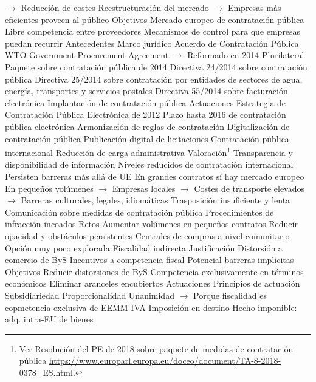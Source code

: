 \documentclass{nuevotema}
\begin{document}
\begin{esquemal}
				\4[] $\to$ Reducción de costes
				\4[] Reestructuración del mercado
				\4[] $\to$ Empresas más eficientes proveen al público
			\3 Objetivos
				\4 Mercado europeo de contratación pública
				\4 Libre competencia entre proveedores
				\4 Mecanismos de control para que empresas puedan recurrir
			\3 Antecedentes
			\3 Marco jurídico
				\4 Acuerdo de Contratación Pública WTO
				\4[] Government Procurement Agreement
				\4[] $\to$ Reformado en 2014
				\4[] Plurilateral
				\4 Paquete sobre contratación pública de 2014
				\4[] Directiva 24/2014 sobre contratación pública
				\4[] Directiva 25/2014 sobre contratación por entidades de sectores de agua, energía, transportes y servicios postales
				\4 Directiva 55/2014 sobre facturación electrónica
				\4[] Implantación de contratación pública
			\3 Actuaciones
				\4 Estrategia de Contratación Pública Electrónica de 2012
				\4[] Plazo hasta 2016 de contratación pública electrónica
				\4 Armonización de reglas de contratación
				\4 Digitalización de contratación pública
				\4[] Publicación digital de licitaciones
				\4 Contratación pública internacional
				\4 Reducción de carga administrativa
			\3 Valoración\footnote{Ver Resolución del PE de 2018 sobre paquete de medidas de contratación pública \url{https://www.europarl.europa.eu/doceo/document/TA-8-2018-0378_ES.html}.}
				\4 Transparencia y disponibilidad de información
				\4 Niveles reducidos de contratación internacional
				\4[] Persisten barreras más allá de UE
				\4[] En grandes contratos sí hay mercado europeo
				\4[] En pequeños volúmenes
				\4[] $\to$ Empresas locales
				\4[] $\to$ Costes de transporte elevados
				\4[] $\to$ Barreras culturales, legales, idiomáticas
				\4 Trasposición insuficiente y lenta
				\4[] Comunicación sobre medidas de contratación pública
				\4[] Procedimientos de infracción incoados
			\3 Retos
				\4 Aumentar volúmenes en pequeños contratos
				\4 Reducir opacidad y obstáculos persistentes
				\4 Centrales de compras a nivel comunitario
				\4[] Opción muy poco explorada
		\2 Fiscalidad indirecta
			\3 Justificación
				\4 Distorsión a comercio de ByS
				\4 Incentivos a competencia fiscal
				\4 Potencial barreras implícitas
			\3 Objetivos
				\4 Reducir distorsiones de ByS
				\4 Competencia exclusivamente en términos económicos
				\4 Eliminar aranceles encubiertos
			\3 Actuaciones
				\4 Principios de actuación
				\4[] Subsidiariedad
				\4[] Proporcionalidad
				\4[] Unanimidad
				\4[] $\to$ Porque fiscalidad es copmetencia exclusiva de EEMM
				\4 IVA
				\4[] Imposición en destino
				\4[] Hecho imponible: adq. intra-EU de bienes

\end{esquemal}
\end{document}
